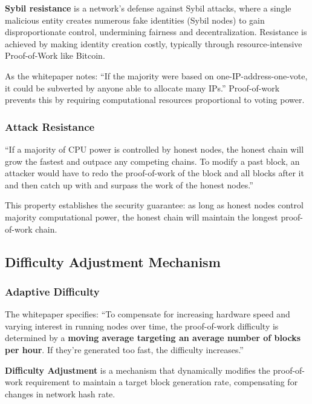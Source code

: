 \textbf{Sybil resistance} is a network's defense against Sybil attacks, where a single malicious entity creates numerous fake identities (Sybil nodes) to gain disproportionate control, undermining fairness and decentralization. Resistance is achieved by making identity creation costly, typically through resource-intensive Proof-of-Work like Bitcoin.

As the whitepaper notes: ``If the majority were based on one-IP-address-one-vote, it could be subverted by anyone able to allocate many IPs.'' Proof-of-work prevents this by requiring computational resources proportional to voting power.

\subsubsection{Attack Resistance}

``If a majority of CPU power is controlled by honest nodes, the honest chain will grow the fastest and outpace any competing chains. To modify a past block, an attacker would have to redo the proof-of-work of the block and all blocks after it and then catch up with and surpass the work of the honest nodes.''

This property establishes the security guarantee: as long as honest nodes control majority computational power, the honest chain will maintain the longest proof-of-work chain.

\needspace{3in}
\subsection{Difficulty Adjustment Mechanism}
\label{subsec:difficulty-adjustment}

\subsubsection{Adaptive Difficulty}

The whitepaper specifies: ``To compensate for increasing hardware speed and varying interest in running nodes over time, the proof-of-work difficulty is determined by a \textbf{moving average targeting an average number of blocks per hour}. If they're generated too fast, the difficulty increases.''

\textbf{Difficulty Adjustment} is a mechanism that dynamically modifies the proof-of-work requirement to maintain a target block generation rate, compensating for changes in network hash rate.

